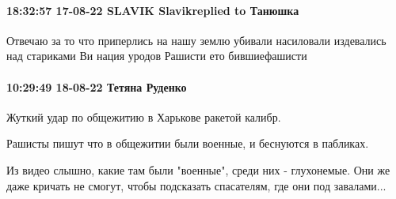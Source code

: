\paragraph{18:32:57 17-08-22 SLAVIK Slavikreplied to Танюшка}

Отвечаю за то что приперлись на нашу землю убивали насиловали издевались над
стариками Ви нация уродов Рашисти ето бившиефашисти

\paragraph{10:29:49 18-08-22 Тетяна Руденко}

Жуткий удар по общежитию в Харькове ракетой калибр.

Рашисты пишут что в общежитии были военные, и беснуются в пабликах.

Из видео слышно, какие там были "военные", среди них - глухонемые. Они же даже
кричать не смогут, чтобы подсказать спасателям, где они под завалами...
